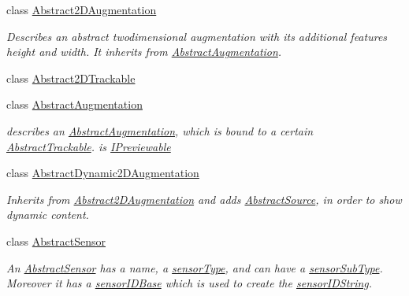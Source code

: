\begin{DoxyCompactItemize}
\item 
class \hyperlink{class_a_rdev_kit_1_1_model_1_1_project_1_1_abstract2_d_augmentation}{Abstract2\-D\-Augmentation}
\begin{DoxyCompactList}\small\item\em Describes an abstract twodimensional augmentation with its additional features height and width. It inherits from \hyperlink{class_a_rdev_kit_1_1_model_1_1_project_1_1_abstract_augmentation}{Abstract\-Augmentation}. \end{DoxyCompactList}\item 
class \hyperlink{class_a_rdev_kit_1_1_model_1_1_project_1_1_abstract2_d_trackable}{Abstract2\-D\-Trackable}
\item 
class \hyperlink{class_a_rdev_kit_1_1_model_1_1_project_1_1_abstract_augmentation}{Abstract\-Augmentation}
\begin{DoxyCompactList}\small\item\em describes an \hyperlink{class_a_rdev_kit_1_1_model_1_1_project_1_1_abstract_augmentation}{Abstract\-Augmentation}, which is bound to a certain \hyperlink{class_a_rdev_kit_1_1_model_1_1_project_1_1_abstract_trackable}{Abstract\-Trackable}. is \hyperlink{interface_a_rdev_kit_1_1_model_1_1_project_1_1_i_previewable}{I\-Previewable} \end{DoxyCompactList}\item 
class \hyperlink{class_a_rdev_kit_1_1_model_1_1_project_1_1_abstract_dynamic2_d_augmentation}{Abstract\-Dynamic2\-D\-Augmentation}
\begin{DoxyCompactList}\small\item\em Inherits from \hyperlink{class_a_rdev_kit_1_1_model_1_1_project_1_1_abstract2_d_augmentation}{Abstract2\-D\-Augmentation} and adds \hyperlink{class_a_rdev_kit_1_1_model_1_1_project_1_1_abstract_source}{Abstract\-Source}, in order to show dynamic content. \end{DoxyCompactList}\item 
class \hyperlink{class_a_rdev_kit_1_1_model_1_1_project_1_1_abstract_sensor}{Abstract\-Sensor}
\begin{DoxyCompactList}\small\item\em An \hyperlink{class_a_rdev_kit_1_1_model_1_1_project_1_1_abstract_sensor}{Abstract\-Sensor} has a name, a \hyperlink{class_a_rdev_kit_1_1_model_1_1_project_1_1_abstract_sensor_a01251db96ea5e0fb0abe1df0a129e751}{sensor\-Type}, and can have a \hyperlink{class_a_rdev_kit_1_1_model_1_1_project_1_1_abstract_sensor_a29b9e916f374e31196689e9d7ac73123}{sensor\-Sub\-Type}. Moreover it has a \hyperlink{class_a_rdev_kit_1_1_model_1_1_project_1_1_abstract_sensor_a2f9524a6aba4331373c0c1968b2f6f4d}{sensor\-I\-D\-Base} which is used to create the \hyperlink{class_a_rdev_kit_1_1_model_1_1_project_1_1_abstract_sensor_ae12a6c3bfe5686d888d7e36c9b19df47}{sensor\-I\-D\-String}. \end{DoxyCompactList}\item 

\end{DoxyCompactItemize}

